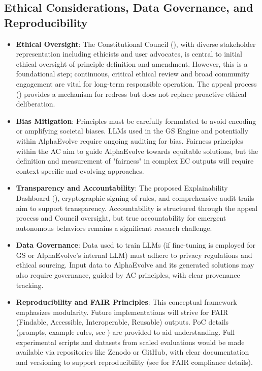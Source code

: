 \documentclass[sigconf,natbib]{acmart}
\begin{document}
\subsection{Ethical Considerations, Data Governance, and Reproducibility}
\label{subsec:ethics_governance_reproducibility}
\begin{itemize}
    \item \textbf{Ethical Oversight}: The Constitutional Council (), with diverse stakeholder representation including ethicists and user advocates, is central to initial ethical oversight of principle definition and amendment. However, this is a foundational step; continuous, critical ethical review and broad community engagement are vital for long-term responsible operation. The appeal process () provides a mechanism for redress but does not replace proactive ethical deliberation.
    \item \textbf{Bias Mitigation}: Principles must be carefully formulated to avoid encoding or amplifying societal biases. LLMs used in the GS Engine and potentially within AlphaEvolve require ongoing auditing for bias. Fairness principles within the AC aim to guide AlphaEvolve towards equitable solutions, but the definition and measurement of "fairness" in complex EC outputs will require context-specific and evolving approaches.
    \item \textbf{Transparency and Accountability}: The proposed Explainability Dashboard (), cryptographic signing of rules, and comprehensive audit trails aim to support transparency. Accountability is structured through the appeal process and Council oversight, but true accountability for emergent autonomous behaviors remains a significant research challenge.
    \item \textbf{Data Governance}: Data used to train LLMs (if fine-tuning is employed for GS or AlphaEvolve's internal LLM) must adhere to privacy regulations and ethical sourcing. Input data to AlphaEvolve and its generated solutions may also require governance, guided by AC principles, with clear provenance tracking.
    \item \textbf{Reproducibility and FAIR Principles}: This conceptual framework emphasizes modularity. Future implementations will strive for FAIR (Findable, Accessible, Interoperable, Reusable) outputs. PoC details (prompts, example rules, see ) are provided to aid understanding. Full experimental scripts and datasets from scaled evaluations would be made available via repositories like Zenodo or GitHub, with clear documentation and versioning to support reproducibility (see  for FAIR compliance details).
\end{itemize}
\end{document}
